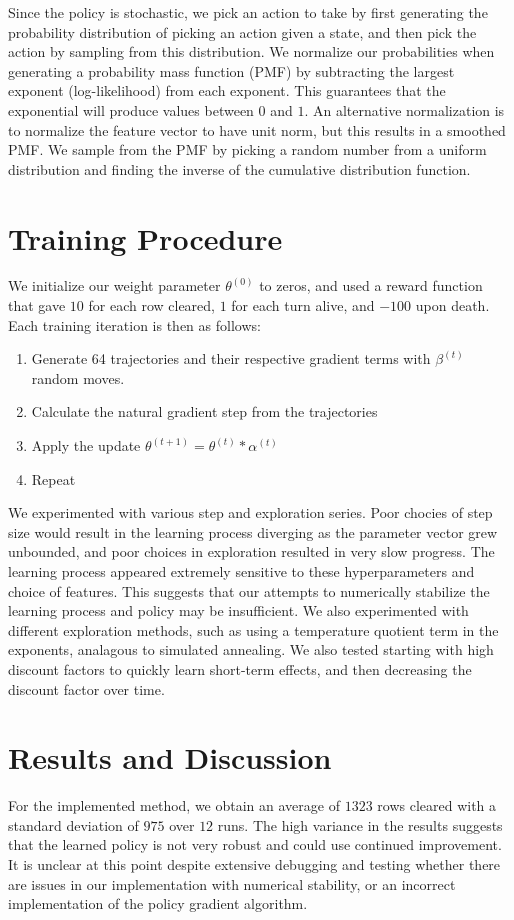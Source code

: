 \documentclass[11pt]{article}
\begin{document}
Since the policy is stochastic, we pick an action to take by first generating the probability distribution of picking an action given a state, and then pick the action by sampling from this distribution. We normalize our probabilities when generating a probability mass function (PMF) by subtracting the largest exponent (log-likelihood) from each exponent. This guarantees that the exponential will produce values between $0$ and $1$. An alternative normalization is to normalize the feature vector to have unit norm, but this results in a smoothed PMF. We sample from the PMF by picking a random number from a uniform distribution and finding the inverse of the cumulative distribution function.

\section{Training Procedure}
We initialize our weight parameter $\theta^{(0)}$ to zeros, and used a reward function that gave $10$ for each row cleared, $1$ for each turn alive, and $-100$ upon death. Each training iteration is then as follows:

\begin{enumerate}
	\item Generate 64 trajectories and their respective gradient terms with $\beta^{(t)}$ random moves.
	\item Calculate the natural gradient step from the trajectories
	\item Apply the update $\theta^{(t+1)} = \theta^{(t)} * \alpha^{(t)}$
	\item Repeat
\end{enumerate}

We experimented with various step and exploration series. Poor chocies of step size would result in the learning process diverging as the parameter vector grew unbounded, and poor choices in exploration resulted in very slow progress. The learning process appeared extremely sensitive to these hyperparameters and choice of features. This suggests that our attempts to numerically stabilize the learning process and policy may be insufficient. We also experimented with different exploration methods, such as using a temperature quotient term in the exponents, analagous to simulated annealing. We also tested starting with high discount factors to quickly learn short-term effects, and then decreasing the discount factor over time.

\section{Results and Discussion}
For the implemented method, we obtain an average of $1323$ rows cleared with a standard deviation of $975$ over $12$ runs. The high variance in the results suggests that the learned policy is not very robust and could use continued improvement. It is unclear at this point despite extensive debugging and testing whether there are issues in our implementation with numerical stability, or an incorrect implementation of the policy gradient algorithm. 



\end{document}
